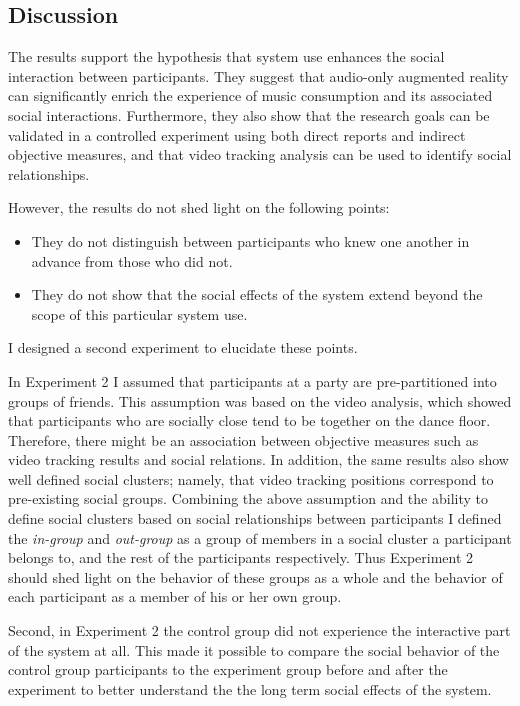 \documentclass[a4paper,11pt]{article}
\newcommand{\definition}[1]{\emph{#1}}
\begin{document}
{\subsection{Discussion}

The results support the hypothesis that system use enhances the social interaction between participants.
They suggest that audio-only augmented reality can significantly enrich the experience of music consumption and its associated social interactions.
Furthermore, they also show that the research goals can be validated in a controlled experiment using both direct reports and indirect objective measures, and that video tracking analysis can be used to identify social relationships.

However, the results do not shed light on the following points:

\begin{itemize}
	\item They do not distinguish between participants who knew one another in advance from those who did not.
	\item They do not show that the social effects of the system extend beyond the scope of this particular system use.
\end{itemize}

I designed a second experiment to elucidate these points.

In Experiment 2 I assumed that participants at a party are pre-partitioned into groups of friends.
This assumption was based on the video analysis, which showed that participants who are socially close tend to be together on the dance floor.
Therefore, there might be an association between objective measures such as video tracking results and social relations.
In addition, the same results also show well defined social clusters;
namely, that video tracking positions correspond to pre-existing social groups.
Combining the above assumption and the ability to define social clusters based on social relationships between participants I defined the \definition{in-group} and \definition{out-group} as a group of members in a social cluster a participant belongs to, and the rest of the participants respectively.
Thus Experiment 2 should shed light on the behavior of these groups as a whole and the behavior of each participant as a member of his or her own group.

Second, in Experiment 2 the control group did not experience the interactive part of the system at all.
This made it possible to compare the social behavior of the control group participants to the experiment group before and after the experiment to better understand the the long term social effects of the system.

}
\end{document}
